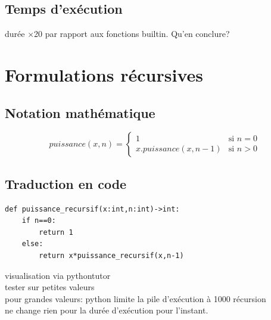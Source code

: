 \documentclass[a4paper,11pt]{article}
\begin{document}
\begin{Form}
\subsection{Temps d'exécution}
\begin{commentprof}
durée ×20 par rapport aux fonctions builtin. Qu'en conclure?
\end{commentprof}
\section{Formulations récursives}
\subsection{Notation mathématique}
$$
puissance(x,n) = \left\{
    \begin{array}{ll}
        1 & \mbox{si } n=0 \\
        x.puissance(x,n-1) & \mbox{si } n>0
    \end{array}
\right.
$$
\subsection{Traduction en code}
\begin{lstlisting}
def puissance_recursif(x:int,n:int)->int:
    if n==0:
        return 1
    else:
        return x*puissance_recursif(x,n-1)
\end{lstlisting}
\begin{commentprof}
visualisation via pythontutor\\
tester sur petites valeurs\\
pour grandes valeurs: python limite la pile d'exécution à 1000 récursion\\
ne change rien pour la durée d'exécution pour l'instant.
\end{commentprof}

\end{Form}
\end{document}
